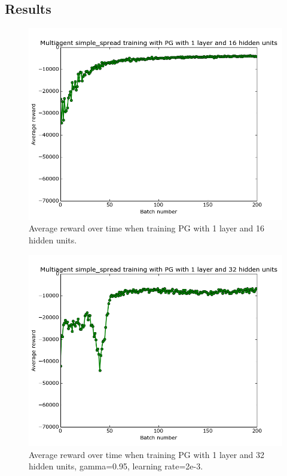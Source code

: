 \documentclass{article}
\begin{document}
\subsection{Results}

\begin{figure}
\begin{center}
    \includegraphics[scale=0.25]{pg_1_16_gamma1}
    \caption{Average reward over time when training PG with 1 layer and 16 hidden units.}
\end{center}
\label{fig:pg-1-16}
\end{figure}

\begin{figure}
\begin{center}
    \includegraphics[scale=0.25]{pg_1_32_gamma95}
    \caption{Average reward over time when training PG with 1 layer and 32 hidden units, gamma=0.95, learning rate=2e-3.}
\end{center}
\label{fig:pg-1-32}
\end{figure}
\end{document}

